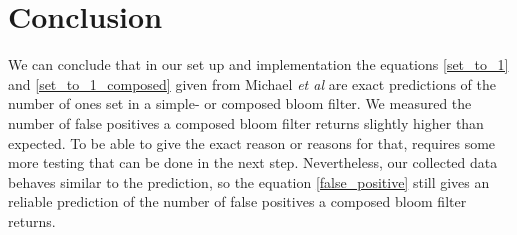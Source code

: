 \documentclass[12]{scrartcl}
\begin{document}
\section{Conclusion}
We can conclude that in our set up and implementation the equations \ref{set_to_1} and \ref{set_to_1_composed} given from Michael {\em et al}\cite{michael} are exact predictions of the number of ones set in a simple- or composed bloom filter. We measured the number of false positives a composed bloom filter returns slightly higher than expected. To be able to give the exact reason or reasons for that, requires some more testing that can be done in the next step. Nevertheless, our collected data behaves similar to the prediction, so the equation \ref{false_positive} still gives an reliable prediction of the number of false positives a composed bloom filter returns.



\end{document}
